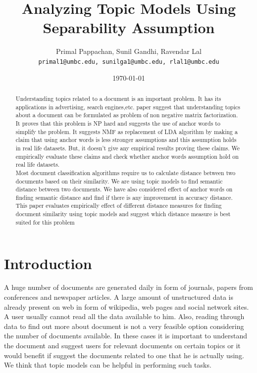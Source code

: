 \documentclass[a4paper,11pt]{article}
\begin{document}

\title{Analyzing Topic Models Using Separability Assumption}
\author{Primal Pappachan, Sunil Gandhi, Ravendar Lal \\ 
\texttt{primal1@umbc.edu, sunilga1@umbc.edu, rlal1@umbc.edu}}
\date{\today}
\maketitle



\begin{abstract}
Understanding topics related to a document is an important problem. It has its applications in advertising, search engines,etc. \cite{tm} paper suggest that understanding topics about a document can be formulated as problem of non negative matrix factorization. It proves that this problem is NP hard and suggests the use of anchor words to simplify the problem. It suggests NMF as replacement of LDA algorithm by making a claim that using anchor words is less stronger assumptions and this assumption holds in real life datasets. But, it doesn't give any empirical results proving these claims. We empirically evaluate these claims and check whether anchor words assumption hold on real life datasets. \\

Most document classification algorithms require us to calculate distance between two documents based on their similarity. We are using topic models to find semantic distance between two documents. We have also considered effect of anchor words on finding semantic distance and find if there is any improvement in accuracy distance. This paper evaluates empirically effect of different distance measures for finding document similarity using topic models and suggest which distance measure is best suited for this problem

\end{abstract}

\pagebreak

\section{Introduction}
A huge number of documents are generated daily in form of journals, papers from conferences and newspaper articles. A large amount of unstructured data is already present on web in form of wikipedia, web pages and social network sites. A user usually cannot read all the data available to him. Also, reading through data to find out more about document is not a very feasible option considering the number of documents available. In these cases it is important to understand the document and suggest users for relevant documents on certain topics or it would benefit if suggest the documents related to one that he is actually using. We think that topic models can be helpful in performing such tasks. \\
\end{document}
